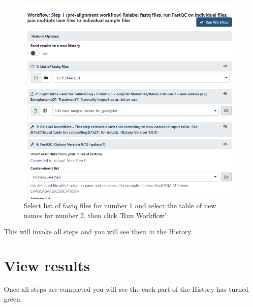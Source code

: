 \documentclass[
]{book}
\begin{document}
\begin{figure}

{\centering \includegraphics[width=1\linewidth]{images/image_run_workflow2} 

}

\caption{Select list of fastq files for number 1 and select the table of new names for number 2, then click 'Run Workflow'}\label{fig:run-workflow}
\end{figure}

This will invoke all steps and you will see them in the History.

\hypertarget{view-results}{%
\section{View results}\label{view-results}}

Once all steps are completed you will see the each part of the History has turned green.
\end{document}
